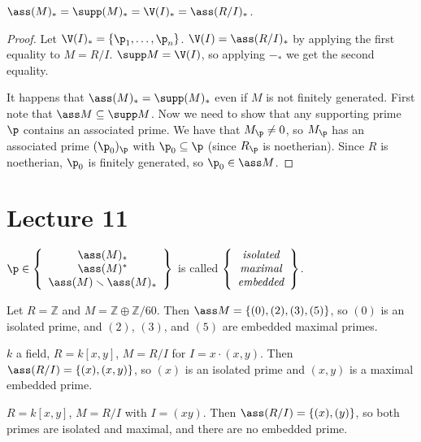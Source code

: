  \begin{theorem}
   $\ass (M)_* = \supp (M)_* = \V(I)_* = \ass (R/I)_*$.
 \end{theorem}
 \begin{proof}
   Let $\V(I)_*= \{\p_1,\dots, \p_n\}$. $\V(I)=\ass(R/I)_*$ by applying the first
   equality to $M=R/I$. $\supp M=\V(I)$, so applying $-_*$ we get the second equality.

   It happens that $\ass (M)_* = \supp (M)_*$ even if $M$ is not finitely generated.
   First note that $\ass M \subseteq \supp M$. Now we need to show that any supporting
   prime $\p$ contains an associated prime. We have that $M_\p\neq 0$, so $M_\p$ has an
   associated prime $(\p_0)_\p$ with $\p_0\subseteq \p$ (since $R_\p$ is noetherian).
   Since $R$ is noetherian, $\p_0$ is finitely generated, so $\p_0\in \ass M$.
 \end{proof}
 \setcounter{lecture}{11}
 \section{Lecture 11}

 \begin{definition}
   $\p\in \left\{\begin{array}{c}\ass (M)_* \\ \ass(M)^*\\ \ass (M)\smallsetminus
   \ass(M)_*\end{array} \right\}$ is called $\left\{\begin{array}{c}\emph{isolated}
   \\
   \emph{maximal}\\ \emph{embedded}\end{array} \right\}$.
 \end{definition}
 \begin{example}
   Let $R=\mathbb{Z}$ and $M=\mathbb{Z}\oplus \mathbb{Z}/60$. Then $\ass M = \{(0),(2),(3),(5)\}$, so $(0)$ is
   an isolated prime, and $(2)$, $(3)$, and $(5)$ are embedded maximal primes.
 \end{example}
 \begin{example}
   $k$ a field, $R=k[x,y]$, $M=R/I$ for $I=x\cdot (x,y)$. Then $\ass
   (R/I)=\{(x),(x,y)\}$, so $(x)$ is an isolated prime and $(x,y)$ is a maximal embedded
   prime.
 \end{example}
 \begin{example}
   $R=k[x,y]$, $M=R/I$ with $I=(xy)$. Then $\ass (R/I)=\{(x),(y)\}$, so both primes are
   isolated and maximal, and there are no embedded prime.
 \end{example}

